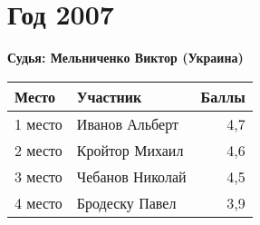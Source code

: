 \chapter{Год 2007}
\textbf{Судья: Мельниченко Виктор (Украина)}

\begin{tabularx}{\textwidth}{l l r}
Место & Участник & Баллы \\
\hline
1 место & Иванов Альберт & 4,7 \\
2 место & Кройтор Михаил & 4,6 \\
3 место & Чебанов Николай & 4,5 \\
4 место & Бродеску Павел & 3,9 \\
\end{tabularx}